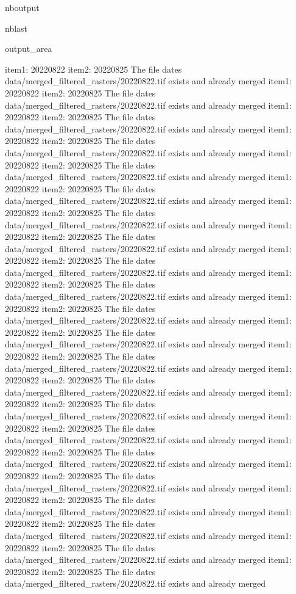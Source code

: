\documentclass[letterpaper,10pt]{sphinxmanual}
\begin{document}
\begin{sphinxuseclass}{nboutput}
\begin{sphinxuseclass}{nblast}
{\begin{sphinxuseclass}{output_area}
\begin{sphinxuseclass}{}
\begin{sphinxVerbatim}[commandchars=\\\{\}]
item1:  20220822
item2:  20220825
The file dates data/merged\_filtered\_rasters/20220822.tif exists and already merged
item1:  20220822
item2:  20220825
The file dates data/merged\_filtered\_rasters/20220822.tif exists and already merged
item1:  20220822
item2:  20220825
The file dates data/merged\_filtered\_rasters/20220822.tif exists and already merged
item1:  20220822
item2:  20220825
The file dates data/merged\_filtered\_rasters/20220822.tif exists and already merged
item1:  20220822
item2:  20220825
The file dates data/merged\_filtered\_rasters/20220822.tif exists and already merged
item1:  20220822
item2:  20220825
The file dates data/merged\_filtered\_rasters/20220822.tif exists and already merged
item1:  20220822
item2:  20220825
The file dates data/merged\_filtered\_rasters/20220822.tif exists and already merged
item1:  20220822
item2:  20220825
The file dates data/merged\_filtered\_rasters/20220822.tif exists and already merged
item1:  20220822
item2:  20220825
The file dates data/merged\_filtered\_rasters/20220822.tif exists and already merged
item1:  20220822
item2:  20220825
The file dates data/merged\_filtered\_rasters/20220822.tif exists and already merged
item1:  20220822
item2:  20220825
The file dates data/merged\_filtered\_rasters/20220822.tif exists and already merged
item1:  20220822
item2:  20220825
The file dates data/merged\_filtered\_rasters/20220822.tif exists and already merged
item1:  20220822
item2:  20220825
The file dates data/merged\_filtered\_rasters/20220822.tif exists and already merged
item1:  20220822
item2:  20220825
The file dates data/merged\_filtered\_rasters/20220822.tif exists and already merged
item1:  20220822
item2:  20220825
The file dates data/merged\_filtered\_rasters/20220822.tif exists and already merged
item1:  20220822
item2:  20220825
The file dates data/merged\_filtered\_rasters/20220822.tif exists and already merged
item1:  20220822
item2:  20220825
The file dates data/merged\_filtered\_rasters/20220822.tif exists and already merged
item1:  20220822
item2:  20220825
The file dates data/merged\_filtered\_rasters/20220822.tif exists and already merged
item1:  20220822
item2:  20220825
The file dates data/merged\_filtered\_rasters/20220822.tif exists and already merged
item1:  20220822
item2:  20220825
The file dates data/merged\_filtered\_rasters/20220822.tif exists and already merged
item1:  20220822
item2:  20220825
The file dates data/merged\_filtered\_rasters/20220822.tif exists and already merged
item1:  20220822
item2:  20220825
The file dates data/merged\_filtered\_rasters/20220822.tif exists and already merged

\end{sphinxVerbatim}
\end{sphinxuseclass}
\end{sphinxuseclass}}
\end{sphinxuseclass}
\end{sphinxuseclass}
\end{document}
